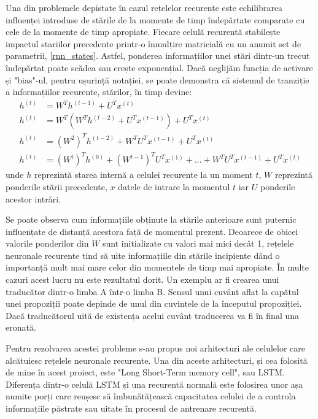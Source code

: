 \documentclass[a4paper,12pt]{book}
\begin{document}
				Una din problemele depistate în cazul rețelelor recurente este echilibrarea influenței introduse de stările de la momente de timp îndepărtate comparate cu cele de la momente de timp apropiate. Fiecare celulă recurentă stabilește impactul stariilor precedente printr-o înmulțire matricială cu un anumit set de parametrii, \ref{rnn_states}. Astfel, ponderea informațiilor unei stări dintr-un trecut îndepărtat poate scădea sau crește exponențial. Dacă neglijăm funcția de activare și "bias"-ul, pentru ușurință notației, se poate demonstra că sistemul de tranziție a informațiilor recurente, stărilor, în timp devine:
				\begin{align*}
				h^{(t)} &=  W^Th^{(t-1)} + U^Tx^{(t)}\\				
				h^{(t)} &=  W^T(W^Th^{(t-2)} + U^Tx^{(t-1)}) + U^Tx^{(t)}\\	
				h^{(t)} &= (W^2)^Th^{(t-2)} + W^TU^Tx^{(t-1)} + U^Tx^{(t)}\\	
				h^{(t)} &= (W^t)^Th^{(0)} + (W^{t-1})^TU^Tx^{(1)}+ ...+ W^TU^Tx^{(t-1)} + U^Tx^{(t)}
				\end{align*}
				unde $h$ reprezintă starea internă a celulei recurente la un moment $t$, $W$ reprezintă ponderile stării precedente, $x$ datele de intrare la momentul $t$ iar $U$ ponderile acestor intrări.\par
				Se poate observa cum informațiile obținute la stările anterioare sunt puternic influențate de distanță acestora față de momentul prezent. Deoarece de obicei valorile ponderilor din $W$ sunt initializate cu valori mai mici decât 1, rețelele neuronale recurente tind să uite informațiile din stările incipiente dând o importanță mult mai mare celor din momentele de timp mai apropiate. În multe cazuri acest lucru nu este rezultatul dorit. Un exemplu ar fi crearea unui traducător dintr-o limba A într-o limba B. Sensul unui cuvânt aflat la capătul unei propoziții poate depinde de unul din cuvintele de la începutul propoziției. Dacă traducătorul uită de existența acelui cuvânt traducerea va fi în final una eronată.\par
				
				Pentru rezolvarea acestei probleme s-au propus noi arhitecturi ale celulelor care alcătuiesc rețelele neuronale recurente. Una din aceste arhitecturi, și cea folosită de mine în acest proiect, este "Long Short-Term memory cell", sau LSTM. Diferența dintr-o celulă LSTM și una recurentă normală este folosirea unor așa numite porți care reușesc să îmbunătățească capacitatea celulei de a controla informațiile păstrate sau uitate în procesul de antrenare recurentă.
				
\end{document}

